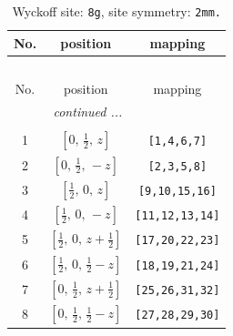 \documentclass[fleqn,8pt]{jsarticle}
\begin{document}
\begin{longtable}{ccc}
\caption{Wyckoff site: {\tt 8g}, site symmetry: {\tt 2mm.}}
 \\
 \hline \hline
No. & position & mapping \\ \hline \endfirsthead

\multicolumn{2}{l}{\tablename\ \thetable{}} \\
 \hline \hline
No. & position & mapping \\ \hline \endhead

 \hline \hline
\multicolumn{2}{r}{\footnotesize\it continued ...} \\ \endfoot

 \hline \hline
\multicolumn{2}{r}{} \\ \endlastfoot

1 & $\left[ 0,\, \frac{1}{2},\, z \right]$ & {\tt [1,4,6,7]} \\ \hline
2 & $\left[ 0,\, \frac{1}{2},\, - z \right]$ & {\tt [2,3,5,8]} \\ \hline
3 & $\left[ \frac{1}{2},\, 0,\, z \right]$ & {\tt [9,10,15,16]} \\ \hline
4 & $\left[ \frac{1}{2},\, 0,\, - z \right]$ & {\tt [11,12,13,14]} \\ \hline
5 & $\left[ \frac{1}{2},\, 0,\, z + \frac{1}{2} \right]$ & {\tt [17,20,22,23]} \\ \hline
6 & $\left[ \frac{1}{2},\, 0,\, \frac{1}{2} - z \right]$ & {\tt [18,19,21,24]} \\ \hline
7 & $\left[ 0,\, \frac{1}{2},\, z + \frac{1}{2} \right]$ & {\tt [25,26,31,32]} \\ \hline
8 & $\left[ 0,\, \frac{1}{2},\, \frac{1}{2} - z \right]$ & {\tt [27,28,29,30]} \\
\end{longtable}
\renewcommand{\arraystretch}{1.2}
\end{document}
